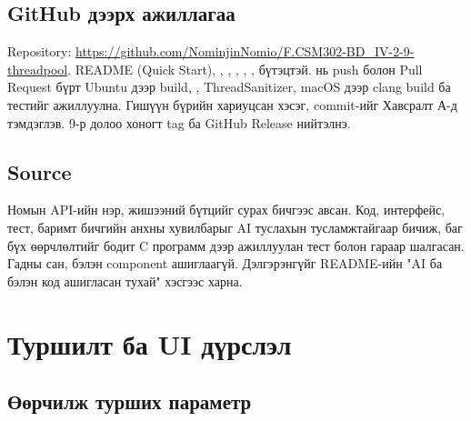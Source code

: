\documentclass[12pt,a4paper]{article}
\begin{document}
\subsection{GitHub дээрх ажиллагаа}

Repository: \url{https://github.com/NominjinNomio/F.CSM302-BD_IV-2-9-threadpool}. README (Quick Start), , , , , ,  бүтэцтэй.  нь push болон Pull Request бүрт Ubuntu дээр build, , ThreadSanitizer, macOS дээр clang build ба тестийг ажиллуулна. Гишүүн бүрийн хариуцсан хэсэг, commit-ийг Хавсралт А-д тэмдэглэв. 9-р долоо хоногт  tag ба GitHub Release нийтэлнэ.

\subsection{Source}

Номын API-ийн нэр,  жишээний бүтцийг сурах бичгээс авсан. Код, интерфейс, тест, баримт бичгийн анхны хувилбарыг AI туслахын тусламжтайгаар бичиж, баг бүх өөрчлөлтийг бодит C программ дээр ажиллуулан тест болон гараар шалгасан. Гадны сан, бэлэн component ашиглаагүй. Дэлгэрэнгүйг README-ийн "AI ба бэлэн код ашигласан тухай" хэсгээс харна.

\section{Туршилт ба UI дүрслэл}

\subsection{Өөрчилж турших параметр}
\end{document}
